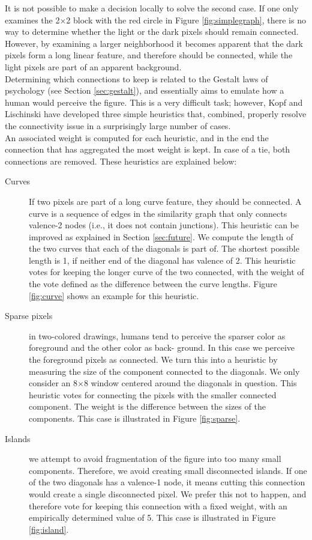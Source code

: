 \documentclass[]{usiinfbachelorproject}
\begin{document}
\noindent It is not possible to make a decision locally to solve the second case. If one only examines the 2$\times$2 block with the red circle in Figure \ref{fig:simplegraph}, there is no way to determine whether the light or the dark pixels should remain connected. However, by examining a larger neighborhood it becomes apparent that the dark pixels form a long linear feature, and therefore should be connected, while the light pixels are part of an apparent background.\\
Determining which connections to keep is related to the Gestalt laws of psychology (see Section \ref{sec:gestalt}), and essentially aims to emulate how a human would perceive the figure. This is a very difficult task; however, Kopf and Lischinski have developed three simple heuristics that, combined, properly resolve the connectivity issue in a surprisingly large number of cases.\\
An associated weight is computed for each heuristic, and in the end the connection that has aggregated the most weight is kept. In case of a tie, both connections are removed. These heuristics are explained below:
\begin{description}
	\item[Curves] If two pixels are part of a long curve feature, they should be connected. A curve is a sequence of edges in the similarity graph that only connects valence-2 nodes (i.e., it does not contain junctions). This heuristic can be improved as explained in Section \ref{sec:future}. We compute the length of the two curves that each of the diagonals is part of. The shortest possible length is 1, if neither end of the diagonal has valence of 2. This heuristic votes for keeping the longer curve of the two connected, with the weight of the vote defined as the difference between the curve lengths. Figure \ref{fig:curve} shows an example for this heuristic.
	\item[Sparse pixels] in two-colored drawings, humans tend to perceive the sparser color as foreground and the other color as back- ground. In this case we perceive the foreground pixels as connected. We turn this into a heuristic by measuring the size of the component connected to the diagonals. We only consider an 8$\times$8 window centered around the diagonals in question. This heuristic votes for connecting the pixels with the smaller connected component. The weight is the difference between the sizes of the components. This case is illustrated in Figure \ref{fig:sparse}.
	\item[Islands] we attempt to avoid fragmentation of the figure into too many small components. Therefore, we avoid creating small disconnected islands. If one of the two diagonals has a valence-1 node, it means cutting this connection would create a single disconnected pixel. We prefer this not to happen, and therefore vote for keeping this connection with a fixed weight, with an empirically determined value of 5. This case is illustrated in Figure \ref{fig:island}.
\end{description}
\end{document}
